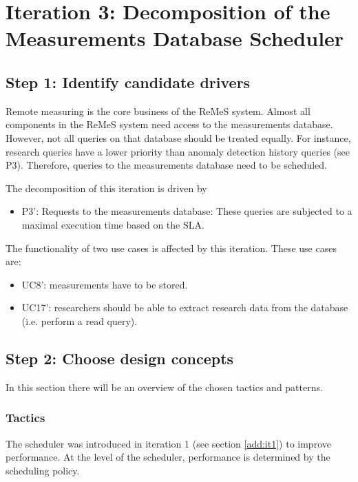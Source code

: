 \section{Iteration 3: Decomposition of the Measurements Database Scheduler}
\label{add:it3}

\subsection{Step 1: Identify candidate drivers}
\label{add:it3/drivers}

\npar Remote measuring is the core business of the ReMeS system. Almost all
components in the ReMeS system need access to the measurements database.
However, not all queries on that database should be treated equally. For
instance, research queries have a lower priority than anomaly detection history
queries (see P3). Therefore, queries to the measurements database need to be
scheduled.

\npar The decomposition of this iteration is driven by

\begin{itemize}
	\item P3': Requests to the measurements database: These queries are subjected
	to a maximal execution time based on the SLA. 
\end{itemize}

\npar The functionality of two use cases is affected by this iteration. These
use cases are:

\begin{itemize}
  \item UC8': measurements have to be stored.
  \item UC17': researchers should be able to extract research data from the
  database (i.e. perform a read query).
\end{itemize}

\subsection{Step 2: Choose design concepts}
\label{add:it3/concepts}

\npar In this section there will be an overview of the chosen tactics and
patterns.

\subsubsection{Tactics}
\label{add:it3/tactics}

\npar The scheduler was introduced in iteration 1 (see section \ref{add:it1}) to
improve performance. At the level of the scheduler, performance is determined by
the scheduling policy. 

